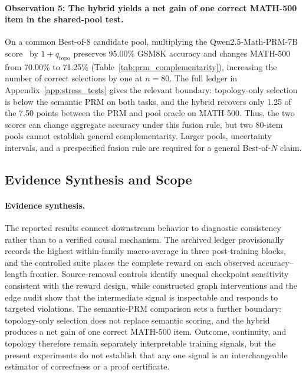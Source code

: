 

\paragraph{Observation 5: The hybrid yields a net gain of one correct MATH-500 item in the shared-pool test.}
On a common Best-of-8 candidate pool, multiplying the Qwen2.5-Math-PRM-7B score~\citep{zhang2025qwen25mathprm} by $1+q_{\mathrm{topo}}$ preserves 95.00\% GSM8K accuracy and changes MATH-500 from 70.00\% to 71.25\% (Table~\ref{tab:prm_complementarity}), increasing the number of correct selections by one at $n=80$. The full ledger in Appendix~\ref{app:stress_tests} gives the relevant boundary: topology-only selection is below the semantic PRM on both tasks, and the hybrid recovers only 1.25 of the 7.50 points between the PRM and pool oracle on MATH-500. Thus, the two scores can change aggregate accuracy under this fusion rule, but two 80-item pools cannot establish general complementarity. Larger pools, uncertainty intervals, and a prespecified fusion rule are required for a general Best-of-$N$ claim.

\subsection{Evidence Synthesis and Scope}

\paragraph{Evidence synthesis.}
The reported results connect downstream behavior to diagnostic consistency rather than to a verified causal mechanism. The archived ledger provisionally records the highest within-family macro-average in three post-training blocks, and the controlled suite places the complete reward on each observed accuracy--length frontier. Source-removal controls identify unequal checkpoint sensitivity consistent with the reward design, while constructed graph interventions and the edge audit show that the intermediate signal is inspectable and responds to targeted violations. The semantic-PRM comparison sets a further boundary: topology-only selection does not replace semantic scoring, and the hybrid produces a net gain of one correct MATH-500 item. Outcome, continuity, and topology therefore remain separately interpretable training signals, but the present experiments do not establish that any one signal is an interchangeable estimator of correctness or a proof certificate.

